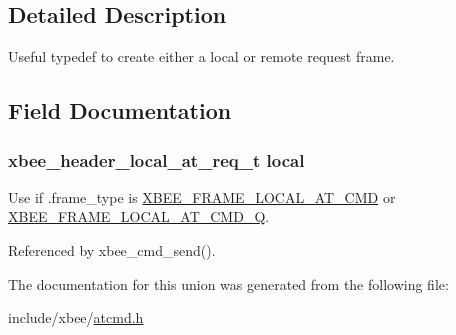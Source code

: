 \subsection{Detailed Description}
Useful typedef to create either a local or remote request frame. 

\subsection{Field Documentation}
\hypertarget{unionxbee__header__at__request__t_aae9b1a9bf279fa1932c6222e3d4b5da2}{
\subsubsection[{local}]{\setlength{\rightskip}{0pt plus 5cm}xbee\-\_\-header\-\_\-local\-\_\-at\-\_\-req\-\_\-t local}}\label{unionxbee__header__at__request__t_aae9b1a9bf279fa1932c6222e3d4b5da2}


Use if .frame\-\_\-type is \hyperlink{group__xbee__device_gga7753bbebaf00d6d64942f64b6ae9b7b9a540fdafbf3dbb8b5d07be5888e3573ee}{X\-B\-E\-E\-\_\-\-F\-R\-A\-M\-E\-\_\-\-L\-O\-C\-A\-L\-\_\-\-A\-T\-\_\-\-C\-M\-D} or \hyperlink{group__xbee__device_gga7753bbebaf00d6d64942f64b6ae9b7b9a4dccc9c3f9859247218c0d0a93e2582a}{X\-B\-E\-E\-\_\-\-F\-R\-A\-M\-E\-\_\-\-L\-O\-C\-A\-L\-\_\-\-A\-T\-\_\-\-C\-M\-D\-\_\-\-Q}. 



Referenced by xbee\-\_\-cmd\-\_\-send().



The documentation for this union was generated from the following file\-:\begin{DoxyCompactItemize}
\item 
include/xbee/\hyperlink{atcmd_8h}{atcmd.\-h}\end{DoxyCompactItemize}
